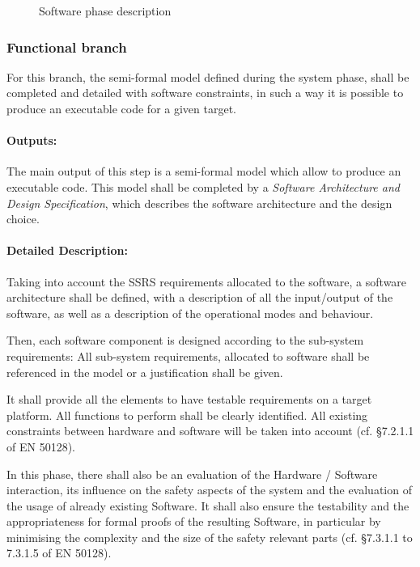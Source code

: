 \begin{figure}[h]
  \centering
  \caption{Software phase description}
  \label{fig:detailed software}
\end{figure}


\subsubsection{Functional branch}
\label{sec:sw-func}

For this branch, the semi-formal model  defined during the system phase, shall  be completed and detailed with software constraints, in such a way it is possible to produce an executable code for a given target.


\paragraph{Outputs:}
\label{sec:sw-func_out}

The main output of this step  is a semi-formal model which  allow to produce an executable code.
This model  shall be completed by a \textit{Software Architecture and Design Specification}, which describes the software architecture and the design choice.


\paragraph{Detailed Description:}
\label{sec:sw-req-deta-descr}

Taking into account the SSRS requirements allocated to  the software, a software architecture shall be defined, with a description of all the input/output of the software, as well as a description of the operational modes and behaviour.

Then, each software component is designed according to  the sub-system  requirements: All sub-system requirements, allocated to  software shall be referenced in the model or a justification shall be given.

It shall provide all the elements to have testable requirements on a target platform. All functions to perform shall be clearly identified. All existing constraints between hardware and software will be taken into account (cf. §7.2.1.1 of EN 50128).



 In this phase, there shall also be an evaluation of the
Hardware / Software interaction, its influence on the safety aspects of the system and the
evaluation of the usage of already existing Software. It shall also ensure the
testability and the appropriateness for formal proofs of the resulting Software, in
particular by minimising the complexity and the size of the safety relevant
parts (cf. §7.3.1.1 to 7.3.1.5 of EN 50128).

